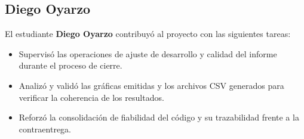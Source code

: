 \subsection{Diego Oyarzo}
El estudiante \textbf{Diego Oyarzo} contribuyó al proyecto con las siguientes tareas:
\begin{itemize}
    \item Supervisó las operaciones de ajuste de desarrollo y calidad del informe durante el proceso de cierre.
    \item Analizó y validó las gráficas emitidas y los archivos CSV generados para verificar la coherencia de los resultados.
    \item Reforzó la consolidación de fiabilidad del código y su trazabilidad frente a la contraentrega.
\end{itemize}
